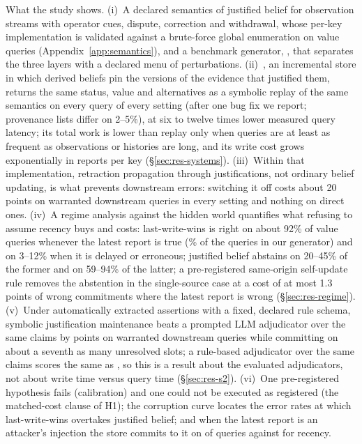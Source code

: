 What the study shows. (i)~A declared semantics of justified belief for observation streams with operator cues, dispute, correction and withdrawal, whose per-key implementation is validated against a brute-force global enumeration on \ovQueries{} value queries (Appendix~\ref{app:semantics}), and a benchmark generator, \rs, that separates the three layers with a declared menu of perturbations. (ii)~\pal, an incremental store in which derived beliefs pin the versions of the evidence that justified them, returns the same status, value and alternatives as a symbolic replay of the same semantics on every query of every setting (after one bug fix we report; provenance lists differ on 2--5\%), at six to twelve times lower measured query latency; its total work is lower than replay only when queries are at least as frequent as observations or histories are long, and its write cost grows exponentially in reports per key (\S\ref{sec:res-systems}). (iii)~Within that implementation, retraction propagation through justifications, not ordinary belief updating, is what prevents downstream errors: switching it off costs about 20 points on warranted downstream queries in every setting and nothing on direct ones. (iv)~A regime analysis against the hidden world quantifies what refusing to assume recency buys and costs: last-write-wins is right on about 92\% of value queries whenever the latest report is true (\rgLatestTruePct\% of the queries in our generator) and on 3--12\% when it is delayed or erroneous; justified belief abstains on 20--45\% of the former and on 59--94\% of the latter; a pre-registered same-origin self-update rule removes the abstention in the single-source case at a cost of at most 1.3 points of wrong commitments where the latest report is wrong (\S\ref{sec:res-regime}). (v)~Under automatically extracted assertions with a fixed, declared rule schema, symbolic justification maintenance beats a prompted LLM adjudicator over the same claims by \sTwoHOne{} points on warranted downstream queries while committing on about a seventh as many unresolved slots; a rule-based adjudicator over the same claims scores the same as \pal, so this is a result about the evaluated adjudicators, not about write time versus query time (\S\ref{sec:res-s2}). (vi)~One pre-registered hypothesis fails (calibration) and one could not be executed as registered (the matched-cost clause of H1); the corruption curve locates the error rates at which last-write-wins overtakes justified belief; and when the latest report is an attacker's injection the store commits to it on \rgPoisPalInj{} of queries against \rgPoisLwwInj{} for recency.

